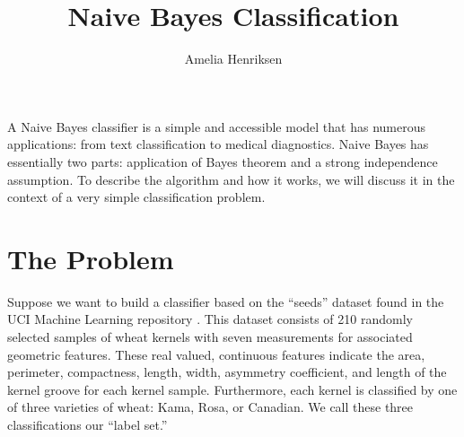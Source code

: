 \documentclass[12pt]{article}
\begin{document}
\title{Naive Bayes Classification}
\author{Amelia Henriksen}
\maketitle

A Naive Bayes classifier is a simple and accessible model that has numerous applications: from text classification to medical diagnostics. 
Naive Bayes has essentially two parts: application of Bayes theorem and a strong independence assumption.
To describe the algorithm and how it works, we will discuss it in the context of a very simple classification problem.
\section*{The Problem}
Suppose we want to build a classifier based on the ``seeds'' dataset found in the UCI Machine Learning repository \cite{Lichman}.
This dataset consists of 210 randomly selected samples of wheat kernels with seven measurements for associated geometric features.
These real valued, continuous features indicate the area, perimeter, compactness, length, width, asymmetry coefficient, and length of the kernel groove for each kernel sample.
Furthermore, each kernel is classified by one of three varieties of wheat: Kama, Rosa, or Canadian. 
We call these three classifications our ``label set.''
\end{document}
